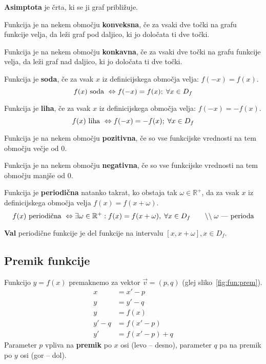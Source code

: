 \documentclass[a4paper,oneside,12pt,fleqn]{article}
\def\R{\ensuremath{\mathbb R}}
\newcommand{\comment}[1]{\ensuremath{\qquad\backslash\backslash\;}\textnormal{#1}}
\renewcommand\iff\Leftrightarrow
\numberwithin{equation}{section}
\begin{document}
\textbf{Asimptota} je črta, ki se ji graf približuje.

Funkcija je na nekem območju \textbf{konveksna}, če za vsaki dve točki na grafu funkcije
velja, da leži graf pod daljico, ki jo določata ti dve točki.

Funkcija je na nekem območju \textbf{konkavna}, če za vsaki dve točki na grafu funkcije velja, da
leži graf nad daljico, ki jo določata ti dve točki.

Funkcija je \textbf{soda}, če za vsak $x$ iz definicijskega območja velja: $f(-x) = f(x)$.
\[ f(x) \textnormal{ soda } \iff f(-x) = f(x); \; \forall x \in D_f \]

Funkcija je \textbf{liha}, če za vsak $x$ iz definicijskega območja velja: $f(-x) = -f(x)$.
\[ f(x) \textnormal{ liha } \iff f(-x) = -f(x); \; \forall x \in D_f \]

Funkcija je na nekem območju \textbf{pozitivna}, če so vse funkcijske vrednosti na tem območju
večje od 0.

Funkcija je na nekem območju \textbf{negativna}, če so vse funkcijske vrednosti na tem območju
manjše od 0.

Funkcija je \textbf{periodična} natanko takrat, ko obstaja tak $\omega \in \R^+$, da za vsak $x$ iz
definicijskega območja velja $f(x) = f(x+\omega)$.
\[ f(x) \textnormal{ periodična } \iff \exists \omega \in \R^+: f(x) = f(x+\omega), \; \forall x \in
D_f \comment{$\omega$ --- perioda} \]

\textbf{Val} periodične funkcije je del funkcije na intervalu $[x, x+\omega], x \in D_f$.

\subsection{Premik funkcije}
\label{sec:fun:prem}
Funkcijo $y = f(x)$ premaknemo za vektor $\vec{v} = (p,q)$ (glej sliko~\ref{fig:fun:prem}).
\begin{align*}
  x &= x'-p \\
  y &= y'-q \\
  y &= f(x) \\
  y' - q &= f(x'-p) \\
  y' &= f(x'-p) + q
\end{align*}
Parameter $p$ vpliva na \textbf{premik}
po $x$ osi (levo -- desno), parameter $q$ pa na premik po $y$ osi (gor -- dol).
\end{document}
